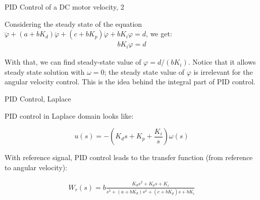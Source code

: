 \documentclass{beamer}
\begin{document}
\begin{frame}{PID Control of a DC motor velocity, 2}
	\begin{flushleft}
		
		Considering the steady state of the equation $\dddot \varphi  + (a+bK_d)\ddot \varphi  + (c+bK_p)\dot\varphi + bK_i \varphi = d$, we get:
		\begin{align}
			bK_i \varphi = d
		\end{align}
	
		With that, we can find steady-state value of $\varphi = d / (bK_i)$. Notice that it allows steady state solution with $\omega = 0$; the steady state value of $\varphi$ is irrelevant for the angular velocity control. This is the idea behind the integral part of PID control.
		
	\end{flushleft}
\end{frame}




\begin{frame}{PID Control, Laplace}
	\begin{flushleft}
		
		PID control in Laplace domain looks like:
		
		\begin{equation}
			u(s) =  - (K_d s + K_p + \frac{K_i}{s}) \omega(s)
		\end{equation}
		
		With reference signal, PID control leads to the transfer function (from reference to angular velocity):
		
		\begin{align}
			W_r(s) = b\frac{K_d s^2 + K_ps + K_i}{s^3  + (a+bK_d ) s^2  + (c+bK_p)s + bK_i}
		\end{align}
		
	\end{flushleft}
\end{frame}
\end{document}
